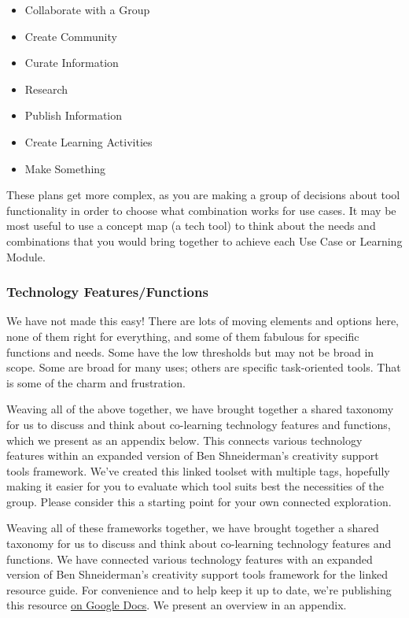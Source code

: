 \begin{itemize}[noitemsep]
\item
  Collaborate with a Group
\item
  Create Community
\item
  Curate Information
\item
  Research
\item
  Publish Information
\item
  Create Learning Activities
\item
  Make Something
\end{itemize}
These plans get more complex, as you are making a group of decisions
about tool functionality in order to choose what combination works for
use cases. It may be most useful to use a concept map (a tech tool) to
think about the needs and combinations that you would bring together to
achieve each Use Case or Learning Module.

\subsubsection{Technology Features/Functions}

We have not made this easy! There are lots of moving elements and
options here, none of them right for everything, and some of them
fabulous for specific functions and needs. Some have the low thresholds
but may not be broad in scope. Some are broad for many uses; others are
specific task-oriented tools. That is some of the charm and frustration.

Weaving all of the above together, we have brought together a shared
taxonomy for us to discuss and think about co-learning technology
features and functions, which we present as an appendix below. This
connects various technology features within an expanded version of Ben
Shneiderman's creativity support tools framework. We've created this
linked toolset with multiple tags, hopefully making it easier for you to
evaluate which tool suits best the necessities of the group. Please
consider this a starting point for your own connected exploration.

Weaving all of these frameworks together, we have brought together a
shared taxonomy for us to discuss and think about co-learning technology
features and functions. We have connected various technology features
with an expanded version of Ben Shneiderman's creativity support tools
framework for the linked resource guide. For convenience and to help
keep it up to date, we're publishing this resource
\href{http://goo.gl/H02fMA}{on Google Docs}. We present an overview
in an appendix.

